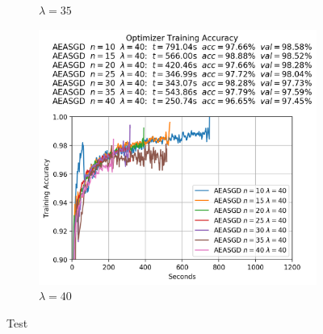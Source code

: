 \begin{figure}
\begin{subfigure}{.3\textwidth}
    \caption{$\lambda = 35$}
  \end{subfigure}
  \begin{subfigure}{.3\textwidth}
    \centering
    \includegraphics[width=\linewidth]{resources/images/aeasgd_experiments_lambda_40}
    \caption{$\lambda = 40$}
  \end{subfigure}
  \label{fig:aeasgd_experiments_lambdas}
  \caption{Test}
\end{figure}

